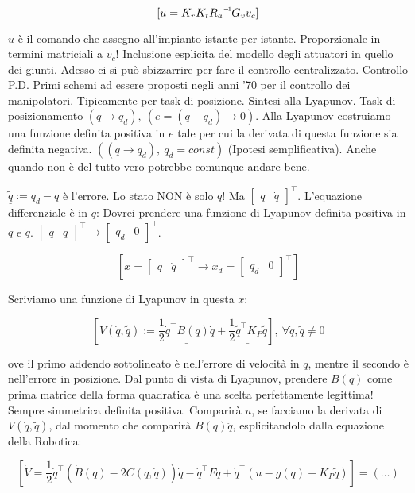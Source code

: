 \[
	[u = K_rK_t\inv{R_a}G_vv_c]
\]

$u$ è il comando che assegno all'impianto istante per istante. Proporzionale in termini matriciali a $v_c$! Inclusione esplicita del modello degli attuatori in quello dei giunti. Adesso ci si può sbizzarrire per fare il controllo centralizzato. Controllo P.D. Primi schemi ad essere proposti negli anni '70 per il controllo dei manipolatori. Tipicamente per task di posizione. Sintesi alla Lyapunov. Task di posizionamento $(q\to q_d),\ (e=(q-q_d)\to 0)$. Alla Lyapunov costruiamo una funzione definita positiva in $e$ tale per cui la derivata di questa funzione sia definita negativa. $((q\to q_d),\ q_d=const)$ (Ipotesi semplificativa). Anche quando non è del tutto vero potrebbe comunque andare bene.

$\underline{\tilde{q}} := q_d-q$ è l'errore. Lo stato NON è solo $q$! Ma $\begin{bmatrix}q&\dot{q}\end{bmatrix}^\top$. L'equazione differenziale è in $\ddot{q}$: Dovrei prendere una funzione di Lyapunov definita positiva in $q$ e $\dot{q}$. $\begin{bmatrix}q&\dot{q}\end{bmatrix}^\top\to\begin{bmatrix}q_d&0\end{bmatrix}^\top$.

\[
	[x = \begin{bmatrix}q&\dot{q}\end{bmatrix}^\top \to x_d = \begin{bmatrix}q_d&0\end{bmatrix}^\top]
\]

Scriviamo una funzione di Lyapunov in questa $x$:

\[
	[V(\dot{q},\tilde{q}) := \underline{\frac{1}{2}\dot{q}^\top B(q)\dot{q}} + \underline{\frac{1}{2}\tilde{q}^\top K_P\tilde{q}}],\ \forall \dot{q},\tilde{q}\neq 0
\]

ove il primo addendo sottolineato è nell'errore di velocità in $\dot{q}$, mentre il secondo è nell'errore in posizione. Dal punto di vista di Lyapunov, prendere $B(q)$ come prima matrice della forma quadratica è una scelta perfettamente legittima! Sempre simmetrica definita positiva. Comparirà $u$, se facciamo la derivata di $V(\dot{q},\tilde{q})$, dal momento che comparirà $B(q)\ddot{q}$, esplicitandolo dalla equazione della Robotica:

\[
	[\dot{V} = \frac{1}{2}\dot{q}^\top(\dot{B}(q)-2C(q,\dot{q}))\dot{q} - \dot{q}^\top F\dot{q} + \dot{q}^\top(u-g(q)-K_P\tilde{q})] = (\dots)
\]


